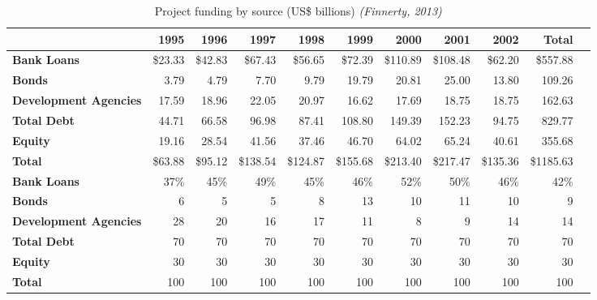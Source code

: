 \begin{table*}[] \centering
\begin{small}
\begin{tabular}{@{}lrrrrrrrrrr@{}}\toprule
 & \textbf{1995} & \textbf{1996} & \textbf{1997} & \textbf{1998} & \textbf{1999} & \textbf{2000} & \textbf{2001} & \textbf{2002} & \textbf{Total}\\ \midrule
\textbf{Bank Loans} & \$23.33 & \$42.83 & \$67.43 & \$56.65 & \$72.39 & \$110.89 & \$108.48 & \$62.20 & \$557.88\\ \hdashline
\textbf{Bonds} & 3.79 & 4.79 & 7.70 & 9.79 & 19.79 & 20.81 & 25.00 & 13.80 & 109.26\\ \hdashline
\textbf{Development Agencies} & 17.59 & 18.96 & 22.05 & 20.97 & 16.62 & 17.69 & 18.75 & 18.75 & 162.63\\ \hdashline
\textbf{Total Debt} & 44.71 & 66.58 & 96.98 & 87.41 & 108.80 & 149.39 & 152.23 & 94.75 & 829.77\\ \hdashline
\textbf{Equity} & 19.16 & 28.54 & 41.56 & 37.46 & 46.70 & 64.02 & 65.24 & 40.61 & 355.68\\ \midrule
\textbf{Total} & \$63.88 & \$95.12 & \$138.54 & \$124.87 & \$155.68 & \$213.40 & \$217.47 & \$135.36 & \$1185.63\\ \midrule
\textbf{Bank Loans} & 37\% & 45\% & 49\% & 45\% & 46\% & 52\% & 50\% & 46\% & 42\% \\ \hdashline
\textbf{Bonds} & 6 & 5 & 5 & 8 & 13 & 10 & 11 & 10 & 9\\ \hdashline
\textbf{Development Agencies} & 28 & 20 & 16 & 17 & 11 & 8 & 9 & 14 & 14\\ \hdashline
\textbf{Total Debt} & 70 & 70 & 70 & 70 & 70 & 70 & 70 & 70 & 70\\ \hdashline
\textbf{Equity} & 30 & 30 & 30 & 30 & 30 & 30 & 30 & 30 & 30\\ \midrule
\textbf{Total} & 100  & 100  & 100  & 100  & 100  & 100  & 100  & 100  & 100\\
\bottomrule
\end{tabular}
\end{small}
\caption{Project funding by source (US\$ billions) \emph{(Finnerty, 2013)}}
\end{table*}

